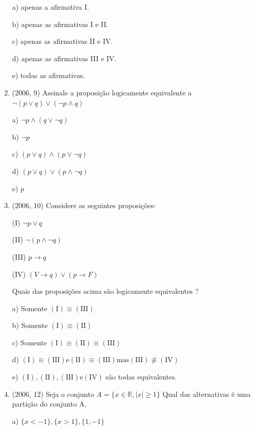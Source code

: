 \documentclass{article}
\begin{document}
\begin{enumerate}
a) apenas a afirmativa I.

b) apenas as afirmativas I e II.

c) apenas as afirmativas II e IV.

d) apenas as afirmativas III e IV.

e) todas as afirmativas.\newline





\item(2006, 9) Assinale a proposição logicamente equivalente a $\neg(p \vee q) \vee(\neg p \wedge q)$

a) $\neg p \wedge(q \vee \neg q)$

b) $\neg p$

c) $(p \vee q) \wedge(p \vee \neg q)$

d) $(p \vee q) \vee(p \wedge \neg q)$

e) $p$ \newline
    



\item(2006, 10) Considere as seguintes proposições:

(I) $\neg p \vee q$

(II) $\neg(p \wedge \neg q)$

(III) $p \longrightarrow q$

(IV) $(V \longrightarrow q) \vee(p \longrightarrow F)$
    
Quais das proposições acima são logicamente equivalentes ?    

a) Somente $(\mathrm{I}) \equiv(\mathrm{III})$

b) Somente $(\mathrm{I}) \equiv(\mathrm{II})$

c) Somente $(\mathrm{I}) \equiv(\mathrm{II}) \equiv(\mathrm{III})$

d) $(\mathrm{I}) \equiv(\mathrm{III}) \mathrm{e}(\mathrm{II}) \equiv(\mathrm{III}) \mathrm{mas}(\mathrm{III}) \not \equiv(\mathrm{IV})$

e) $(\mathrm{I}),(\mathrm{II}),(\mathrm{III}) \mathrm{e}(\mathrm{IV})$ sâo todas equivalentes.\newline




\item(2006, 12) Seja o conjunto $A=\{x \in \mathbb{R},|x| \geq 1\}$ Qual das alternativas é uma partição do
conjunto A.

a) $\{x<-1\},\{x>1\},\{1,-1\}$


\end{enumerate}
\end{document}

